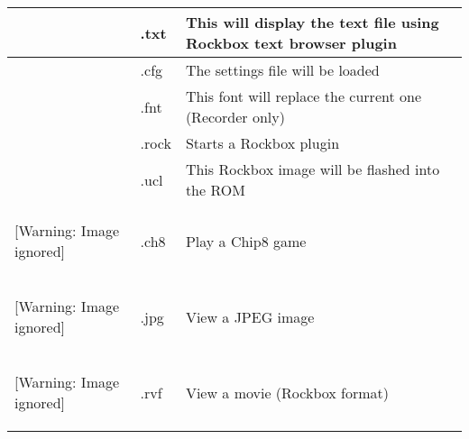 \begin{center}
\begin{tabular}{|p{0.46100003cm}|p{3.296cm}|p{12.339cm}|}
&
.txt
&
This will display the text file using Rockbox text browser plugin
\\\hline
  [Warning: Image ignored] %
 
&
.cfg
&
The settings file will be loaded
\\\hline
  [Warning: Image ignored] %
 
&
.fnt
&
This font will replace the current one (Recorder only)
\\\hline
  [Warning: Image ignored] %
 
&
.rock
&
Starts a Rockbox plugin
\\\hline
  [Warning: Image ignored] %
 
&
.ucl
&
This Rockbox image will be flashed into the ROM
\\\hline

\begin{center}
 [Warning: Image ignored] %

\end{center}
&
.ch8
&
Play a Chip8 game
\\\hline

\begin{center}
 [Warning: Image ignored] %

\end{center}
&
.jpg
&
View a JPEG image
\\\hline

\begin{center}
 [Warning: Image ignored] %

\end{center}
&
.rvf
&
View a movie (Rockbox format)
\\\hline
\end{tabular}\end{center}

